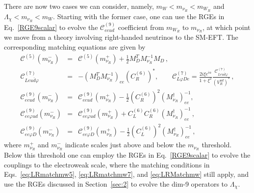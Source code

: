 \documentclass[letterpaper,11pt]{article}
\newcommand{\al}{\alpha}
\newcommand{\bea}{\begin{eqnarray}}
\newcommand{\eea}{\end{eqnarray}}
\newcommand{\vp}{\varphi}
\newcommand{\sq}{^{2}}
\newcommand{\nn}{\nonumber}
\begin{document}
There are now two cases we can consider, namely, $m_W<m_{\nu_R}<m_{W_R}$ and  $\Lambda_\chi<m_{\nu_R}<m_{W}$. Starting with the former case, one can use the RGEs in Eq.\ \eqref{RGE9scalar} to evolve the $\mathcal C^{(9)}_{eeud}$ coefficient from $m_{W_R}$ to $m_{\nu_R}$, at which point we move from a theory involving right-handed neutrinos to the SM-EFT. The corresponding matching equations are given by
\bea
\mathcal C^{(5)}(m_{\nu_R}^-)& =&
\mathcal C^{(5)}(m_{\nu_R}^+)+{\frac{1}{2}} M_D^T M_{\nu_R}^{-1}M_D\,,\nn\\
\mathcal C^{(7)}_{Leu\bar d \vp} & =&-\left(M_D^T M_{\nu_R}^{-1}\right)_{ee}\left(C_R^{(6)}\right)^*,\qquad \mathcal C^{(7)}_{L\vp De} = \frac{2i\xi e^{i\al}}{1+\xi\sq}\frac{\mathcal C_{Leu\bar d\vp}^{(7)}}{\left(V_R^{ud}\right)^*}\,,\nn\\
\mathcal C^{(9)}_{eeud}(m_{\nu_R}^-) &=&
\mathcal C^{(9)}_{eeud}(m_{\nu_R}^+)-\frac{1}{2}\left(C_R^{(6)}\right)\sq \left(M_{\nu_R}^\dagger\right)^{-1}_{ee}
,\nn\\
\mathcal C^{(9)}_{ee\varphi u d}(m_{\nu_R}^-)&=&\mathcal C^{(9)}_{ee\varphi u d}(m_{\nu_R}^+)+C_L^{(6)}C_R^{(6)} \left(M_{\nu_R}^\dagger\right)^{-1}_{ee}
\,,\nn\\
\mathcal C_{ee \varphi D}^{(9)}(m_{\nu_R}^-)&=&\mathcal C_{ee \varphi D}^{(9)}(m_{\nu_R}^+)-\frac{1}{2}\left(C_L^{(6)}\right)\sq \left(M_{\nu_R}^\dagger\right)^{-1}_{ee}\,,
\eea
where $m_{\nu_R}^+$ and $m_{\nu_R}^-$ indicate scales just above and below the $m_{\nu_R}$ threshold.
Below this threshold one can employ the RGEs in Eq.\ \eqref{RGE9scalar} to evolve the couplings to the electroweak scale, where the matching conditions in Eqs.\ \eqref{eq:LRmatchmw5}, \eqref{eq:LRmatchmw7}, and \eqref{eq:LRMatchmw} still apply, and use the RGEs discussed in Section\ \ref{sec:2} to evolve the dim-9 operators to $\Lambda_\chi$. 
\end{document}

